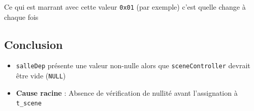 \documentclass[a4paper,11pt]{article}
\begin{document}
Ce qui est marrant avec cette valeur \texttt{0x01} (par exemple) c'est quelle change à chaque fois

\subsection*{Conclusion}
\begin{itemize}
    \item \texttt{salleDep} présente une valeur non-nulle alors que \texttt{sceneController} devrait être vide (\texttt{NULL})
    \item \textbf{Cause racine} : Absence de vérification de nullité avant l'assignation à \texttt{t\_scene}
\end{itemize}
\end{document}
